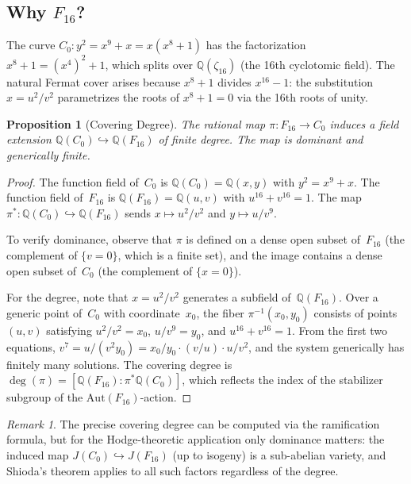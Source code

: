 \documentclass[11pt]{article}
\theoremstyle{plain}
\newtheorem{proposition}[theorem]{Proposition}
\theoremstyle{definition}
\theoremstyle{remark}
\newtheorem{remark}[theorem]{Remark}
\newcommand{\Q}{\mathbb{Q}}
\begin{document}
\subsection{Why $F_{16}$?}

The curve $C_0\colon y^2 = x^9 + x = x(x^8 + 1)$ has the
factorization $x^8 + 1 = (x^4)^2 + 1$, which splits over
$\Q(\zeta_{16})$ (the 16th cyclotomic field).  The natural
Fermat cover arises because $x^8 + 1$ divides $x^{16} - 1$:
the substitution $x = u^2/v^2$ parametrizes the roots of
$x^8 + 1 = 0$ via the 16th roots of unity.

\begin{proposition}[Covering Degree]\label{prop:degree}
The rational map $\pi\colon F_{16} \to C_0$ induces a
field extension $\Q(C_0) \hookrightarrow \Q(F_{16})$ of
finite degree.  The map is dominant and generically finite.
\end{proposition}

\begin{proof}
The function field of~$C_0$ is $\Q(C_0) = \Q(x,y)$ with
$y^2 = x^9 + x$.  The function field of~$F_{16}$ is
$\Q(F_{16}) = \Q(u,v)$ with $u^{16} + v^{16} = 1$.
The map $\pi^*\colon \Q(C_0) \hookrightarrow \Q(F_{16})$
sends $x \mapsto u^2/v^2$ and $y \mapsto u/v^9$.

To verify dominance, observe that $\pi$ is defined on a
dense open subset of~$F_{16}$ (the complement of $\{v = 0\}$,
which is a finite set), and the image contains a dense open
subset of~$C_0$ (the complement of $\{x = 0\}$).

For the degree, note that $x = u^2/v^2$ generates a subfield
of~$\Q(F_{16})$.  Over a generic point of~$C_0$ with
coordinate~$x_0$, the fiber $\pi^{-1}(x_0, y_0)$ consists of
points $(u,v)$ satisfying $u^2/v^2 = x_0$, $u/v^9 = y_0$,
and $u^{16} + v^{16} = 1$.  From the first two equations,
$v^7 = u/(v^2 y_0) = x_0/y_0 \cdot (v/u) \cdot u/v^2$,
and the system generically has finitely many solutions.  The
covering degree is $\deg(\pi) = [\Q(F_{16}) : \pi^*\Q(C_0)]$,
which reflects the index of the stabilizer subgroup of the
$\mathrm{Aut}(F_{16})$-action.
\end{proof}

\begin{remark}
The precise covering degree can be computed via the
ramification formula, but for the Hodge-theoretic application
only dominance matters: the induced map
$J(C_0) \hookrightarrow J(F_{16})$ (up to isogeny) is a
sub-abelian variety, and Shioda's theorem applies to all
such factors regardless of the degree.
\end{remark}
\end{document}
